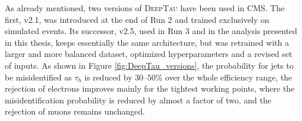 As already mentioned, two versions of \textsc{DeepTau} have been used in CMS. The first, v2.1, was introduced at the end of Run 2 and trained exclusively on simulated events. Its successor, v2.5, used in Run 3 and in the analysis presented in this thesis, keeps essentially the same architecture, but was retrained with a larger and more balanced dataset, optimized hyperparameters and a revised set of inputs. As shown in Figure \ref{fig:DeepTau_versions}, the probability for jets to be misidentified as $\tau_h$ is reduced by $30$–$50\%$ over the whole efficiency range, the rejection of electrons improves mainly for the tightest working points, where the misidentification probability is reduced by almost a factor of two, and the rejection of muons remains unchanged.
%

